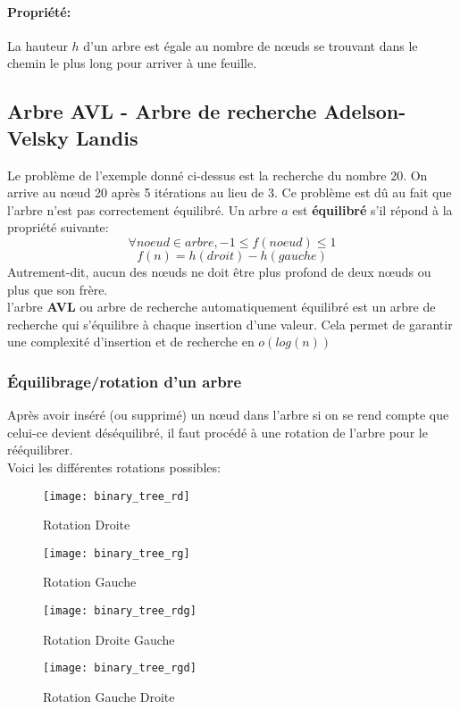 \documentclass[11pt]{extarticle}
\begin{document}
\paragraph{Propriété:} La hauteur $h$ d'un arbre est égale au nombre de nœuds se trouvant dans le chemin le plus long pour arriver à une feuille.
\subsection{Arbre AVL - Arbre de recherche Adelson-Velsky Landis}
Le problème de l'exemple donné ci-dessus est la recherche du nombre 20. On arrive au nœud 20 après 5 itérations au lieu de 3. Ce problème est dû au fait que l'arbre n'est pas correctement équilibré.
Un arbre $a$ est \textbf{équilibré} s'il répond à la propriété suivante:
$$
\forall noeud \in arbre, -1 \leq f(noeud) \leq 1
$$
$$
f(n) = h(droit) - h(gauche)
$$
Autrement-dit, aucun des nœuds ne doit être plus profond de deux nœuds ou plus que son frère.\\
l'arbre \textbf{AVL} ou arbre de recherche automatiquement équilibré est un arbre de recherche qui s'équilibre à chaque insertion d'une valeur. Cela permet de garantir une complexité d'insertion et de recherche en $o(log(n))$
\subsubsection{Équilibrage/rotation d'un arbre}
Après avoir inséré (ou supprimé) un nœud dans l'arbre si on se rend compte que celui-ce devient déséquilibré, il faut procédé à une rotation de l'arbre pour le rééquilibrer.\\
Voici les différentes rotations possibles:
\begin{figure}[h]
\begin{center}
\texttt{[image: binary\_tree\_rd]}
\caption{Rotation Droite}
\end{center}
\end{figure}
\begin{figure}[H]
\begin{center}
\texttt{[image: binary\_tree\_rg]}
\caption{Rotation Gauche}
\end{center}
\end{figure}
\begin{figure}[H]
\centering
\texttt{[image: binary\_tree\_rdg]}
\caption{Rotation Droite Gauche}
\end{figure}
\begin{figure}[H]
\centering
\texttt{[image: binary\_tree\_rgd]}
\caption{Rotation Gauche Droite}
\end{figure}
\newpage
\end{document}
